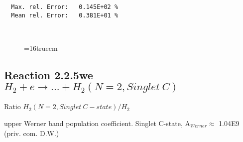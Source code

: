 \documentclass[12pt,dvipdfmx]{article}
\begin{document}
\begin{small}
\begin{verbatim}
  Max. rel. Error:   0.145E+02 %
  Mean rel. Error:   0.381E+01 %



\end{verbatim}\end{small}
\begin{figure} \label{2.2.5fu}
\epsfxsize=16truecm
\end{figure}

\newpage

\subsection{
Reaction 2.2.5we $H_2 + e \rightarrow ...+ H_2(N=2,Singlet \ C)$}

Ratio $H_2(N=2, Singlet \ C-state)/H_2 $

upper Werner band population coefficient. Singlet C-state, A$_{Werner} \approx $ 1.04E9 (priv. com. D.W.)
\end{document}
